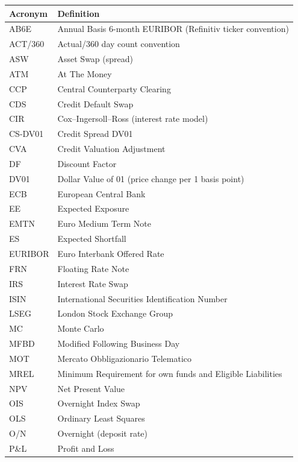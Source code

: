 \documentclass[11pt,a4paper]{article}
\begin{document}
\begin{table}[H]
\centering
\small
\begin{tabular}{@{}ll@{}}
\toprule
\textbf{Acronym} & \textbf{Definition} \\
\midrule
AB6E      & Annual Basis 6-month EURIBOR (Refinitiv ticker convention) \\
ACT/360   & Actual/360 day count convention \\
ASW       & Asset Swap (spread) \\
ATM       & At The Money \\
CCP       & Central Counterparty Clearing \\
CDS       & Credit Default Swap \\
CIR       & Cox--Ingersoll--Ross (interest rate model) \\
CS-DV01   & Credit Spread DV01 \\
CVA       & Credit Valuation Adjustment \\
DF        & Discount Factor \\
DV01      & Dollar Value of 01 (price change per 1 basis point) \\
ECB       & European Central Bank \\
EE        & Expected Exposure \\
EMTN      & Euro Medium Term Note \\
ES        & Expected Shortfall \\
EURIBOR   & Euro Interbank Offered Rate \\
FRN       & Floating Rate Note \\
IRS       & Interest Rate Swap \\
ISIN      & International Securities Identification Number \\
LSEG      & London Stock Exchange Group \\
MC        & Monte Carlo \\
MFBD      & Modified Following Business Day \\
MOT       & Mercato Obbligazionario Telematico \\
MREL      & Minimum Requirement for own funds and Eligible Liabilities \\
NPV       & Net Present Value \\
OIS       & Overnight Index Swap \\
OLS       & Ordinary Least Squares \\
O/N       & Overnight (deposit rate) \\
P\&L      & Profit and Loss \\

\end{tabular}
\end{table}
\end{document}
